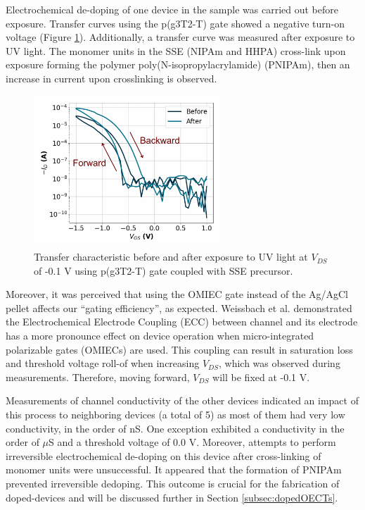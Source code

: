Electrochemical de-doping of one device in the sample was carried out before exposure. Transfer curves using the p(g3T2-T) gate showed a negative turn-on voltage (Figure \ref{fig:revox2}). Additionally, a transfer curve was measured after exposure to UV light. The monomer units in the SSE (NIPAm and HHPA) cross-link upon exposure forming the polymer poly(N-isopropylacrylamide) (PNIPAm), then an increase in current upon crosslinking is observed.

\begin{figure}[ht]
    \centering
    \includegraphics[width=7cm]{Images/pdf/transfer_de-dop_exp.pdf}
    \caption[Transfer characteristics of side-gate OECT with pristine p(g3T2-T)]{Transfer characteristic before and after exposure to UV light at $V_{DS}$ of -0.1 V using p(g3T2-T) gate coupled with SSE precursor.}
    \label{fig:revox2}
\end{figure}

Moreover, it was perceived that using the OMIEC gate instead of the Ag/AgCl pellet affects our ``gating efficiency'', as expected. Weissbach et al.  \cite{weissbachUnravelingElectrochemicalElectrode2023} demonstrated the Electrochemical Electrode Coupling (ECC) between channel and its electrode has a more pronounce effect on device operation when micro-integrated polarizable gates (OMIECs) are used. This coupling can result in saturation loss %
and threshold voltage roll-of when increasing $V_{DS}$, which was observed during measurements. Therefore, moving forward, $V_{DS}$ will be fixed at -0.1 V.

Measurements of channel conductivity of the other devices indicated an impact of this process to neighboring devices (a total of 5) as most of them had very low conductivity, in the order of nS. One exception exhibited a conductivity in the order of $\mu$S and a threshold voltage of 0.0 V. Moreover, attempts to perform irreversible electrochemical de-doping on this device after cross-linking of monomer units were unsuccessful. It appeared that the formation of PNIPAm prevented irreversible dedoping. This outcome is crucial for the fabrication of doped-devices and will be discussed further in Section \ref{subsec:dopedOECTs}.

